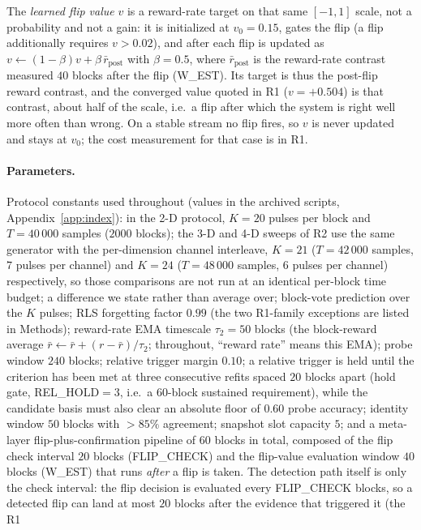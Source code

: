 \documentclass[preprint,12pt]{elsarticle}
\begin{document}
The \emph{learned
flip value} $v$ is a reward-rate target on that same $[-1,1]$ scale, not a
probability and not a gain: it is initialized at $v_0=0.15$, gates the flip
(a flip additionally requires $v>0.02$), and after each flip is updated as
$v\leftarrow(1-\beta)v+\beta\,\bar r_{\mathrm{post}}$ with $\beta=0.5$, where
$\bar r_{\mathrm{post}}$ is the reward-rate contrast measured $40$ blocks
after the flip (W\_EST). Its target is thus the post-flip reward contrast,
and the converged value quoted in R1 ($v=+0.504$) is that contrast, about
half of the scale, i.e.\ a flip after which the system is right well more
often than wrong. On a stable stream no flip fires, so $v$ is never updated
and stays at $v_0$; the cost measurement for that case is in R1.

\paragraph{Parameters.} Protocol constants used throughout (values in the
archived scripts, Appendix~\ref{app:index}): in the 2-D protocol,
$K=20$ pulses per block and $T=40\,000$ samples ($2000$ blocks); the 3-D and
4-D sweeps of R2 use the same generator with the per-dimension channel
interleave, $K=21$ ($T=42\,000$ samples, $7$ pulses per channel) and $K=24$
($T=48\,000$ samples, $6$ pulses per channel) respectively, so those
comparisons are not run at an identical per-block time budget; a
difference we state rather than average over; block-vote prediction over the $K$
pulses; RLS forgetting factor $0.99$ (the two R1-family exceptions are listed
in Methods); reward-rate EMA timescale
$\tau_2=50$ blocks (the block-reward average
$\bar r \leftarrow \bar r + (r - \bar r)/\tau_2$; throughout, ``reward
rate'' means this EMA); probe window $240$ blocks; relative trigger margin
$0.10$; a relative trigger is held until the criterion has been met at three
consecutive refits spaced $20$ blocks apart (hold gate, REL\_HOLD$=3$, i.e.\
a $60$-block sustained requirement), while the candidate basis must also
clear an absolute floor of $0.60$ probe accuracy; identity window $50$ blocks
with $>85\%$ agreement; snapshot slot
capacity $5$; and a meta-layer flip-plus-confirmation pipeline of $60$ blocks
in total, composed of the flip check interval $20$ blocks (FLIP\_CHECK) and
the flip-value evaluation window $40$ blocks (W\_EST) that runs \emph{after}
a flip is taken. The detection path itself is only the check interval: the
flip decision is evaluated every FLIP\_CHECK blocks, so a detected flip can
land at most $20$ blocks after the evidence that triggered it (the R1
\end{document}
